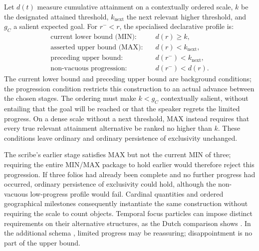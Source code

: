 Let $d(t)$ measure cumulative attainment on a contextually ordered scale,
$k$ be the designated attained threshold, $k_{\mathrm{next}}$ the next
relevant higher threshold, and $g_C$ a salient expected goal. For
$r^{-}<r$, the specialised declarative profile is:
\[
\begin{aligned}
\text{current lower bound (MIN):}\quad & d(r)\geq k,\\
\text{asserted upper bound (MAX):}\quad & d(r)<k_{\mathrm{next}},\\
\text{preceding upper bound:}\quad & d(r^{-})<k_{\mathrm{next}},\\
\text{non-vacuous progression:}\quad & d(r^{-})<d(r).
\end{aligned}
\]
The current lower bound and preceding upper bound are background conditions;
the progression condition restricts this construction to an actual advance
between the chosen stages. The ordering must make $k<g_C$ contextually
salient, without entailing that the goal will be reached or that the speaker
regrets the limited progress. On a dense scale without a next threshold,
MAX instead requires that every true relevant attainment alternative be
ranked no higher than $k$. These conditions leave ordinary  and
ordinary persistence of exclusivity unchanged.

\pex
\a {}
\a {}
\xe

The scribe's earlier stage satisfies MAX but not the current MIN of three;
requiring the entire MIN/MAX package to hold earlier would therefore reject
this progression. If three folios had already been complete and no further
progress had occurred, ordinary persistence of exclusivity could hold,
although the non-vacuous low-progress profile would fail. Cardinal quantities
and ordered geographical milestones consequently instantiate the same
construction without requiring the scale to count objects. Temporal focus
particles can impose distinct requirements on their alternative structures,
as the Dutch comparison shows \cite[§§2--3]{neelemanvandekoot2022}. In the additional
schema , limited
progress may be reassuring; disappointment is no part of the upper bound.

